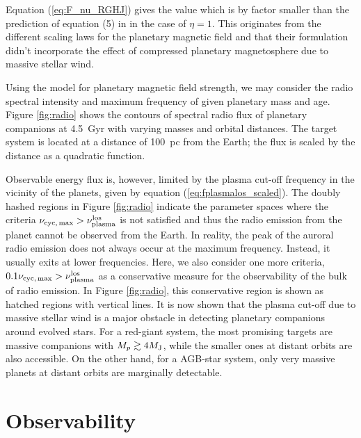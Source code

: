\documentclass[iop,numberedappendix,apj]{emulateapj}
\begin{document}
Equation (\ref{eq:F_nu_RGHJ}) gives the value which is by factor smaller than the prediction of equation (5) in \citet{ignace2010} in the case of $\eta = 1$. This originates from the different scaling laws for the planetary magnetic field and that their formulation didn't incorporate the effect of compressed planetary magnetosphere due to massive stellar wind. 

Using the model for planetary magnetic field strength, we may consider the  radio spectral intensity and maximum frequency of given planetary mass and age. 
Figure \ref{fig:radio} shows the contours of spectral radio flux of planetary companions at 4.5~Gyr with varying masses and orbital distances. 
The target system is located at a distance of 100~pc from the Earth; the flux is scaled by the distance as a quadratic function. 

Observable energy flux is, however, limited by the plasma cut-off frequency in the vicinity of the planets, given by equation (\ref{eq:fplasmalos_scaled}). 
The doubly hashed regions in Figure \ref{fig:radio} indicate the parameter spaces where the criteria $\nu_{\rm cyc,\,max} > \nu_{\rm plasma}^{\rm los}$ is not satisfied and thus the radio emission from the planet cannot be observed from the Earth. 
In reality, the peak of the auroral radio emission does not always occur at the maximum frequency. Instead, it usually exits at lower frequencies. Here, we also consider one more criteria, $0.1 \nu_{\rm cyc,\,max} > \nu_{\rm plasma}^{\rm los}$ as a conservative measure for the observability of the bulk of radio emission. In Figure \ref{fig:radio}, this conservative region is shown as hatched regions with vertical lines. 
It is now shown that the plasma cut-off due to massive stellar wind is a major obstacle in detecting planetary companions around evolved stars. 
For a red-giant system, the most promising targets are massive companions with $M_p \gtrsim 4M_{\rm J}$, while the smaller ones at distant orbits are also accessible.  
On the other hand, for a AGB-star system, only very massive planets at distant orbits are marginally detectable. 


\section{Observability}
\label{s:observability}
\end{document}
